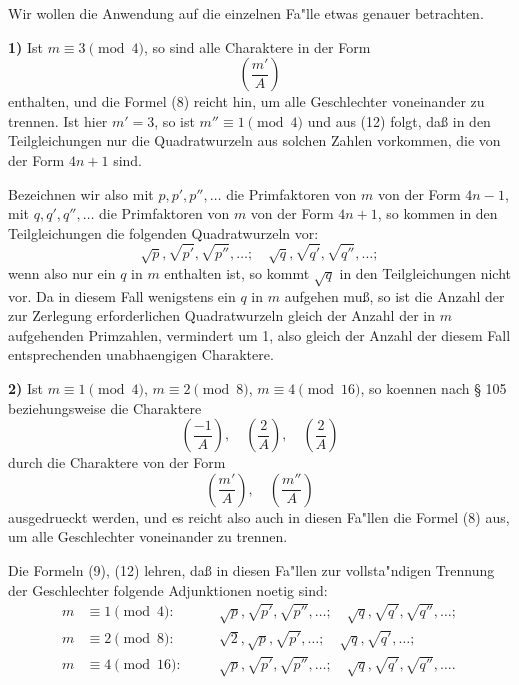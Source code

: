 \documentclass[12pt,a4paper]{article}
\theoremstyle{plain}
\theoremstyle{definition}
\theoremstyle{remark}
\begin{document}
Wir wollen die Anwendung auf die einzelnen Fa"lle etwas genauer betrachten.

\textbf{1)} Ist $m \equiv 3 \pmod{4}$, so sind alle Charaktere in der Form
\begin{equation}\label{eq:138_17}
\left(\frac{m'}{A}\right)
\end{equation}
enthalten, und die Formel (8) reicht hin, um alle Geschlechter voneinander zu trennen. Ist hier $m' = 3$, so ist $m'' \equiv 1 \pmod{4}$ und aus (12) folgt, da\ss{} in den Teilgleichungen nur die Quadratwurzeln aus solchen Zahlen vorkommen, die von der Form $4n + 1$ sind.

Bezeichnen wir also mit $p, p', p'', \ldots$ die Primfaktoren von $m$ von der Form $4n - 1$, mit $q, q', q'', \ldots$ die Primfaktoren von $m$ von der Form $4n + 1$, so kommen in den Teilgleichungen die folgenden Quadratwurzeln vor:
\[
\sqrt{p}, \sqrt{p'}, \sqrt{p''}, \ldots; \quad \sqrt{q}, \sqrt{q'}, \sqrt{q''}, \ldots;
\]
wenn also nur ein $q$ in $m$ enthalten ist, so kommt $\sqrt{q}$ in den Teilgleichungen nicht vor. Da in diesem Fall wenigstens ein $q$ in $m$ aufgehen mu\ss{}, so ist die Anzahl der zur Zerlegung erforderlichen Quadratwurzeln gleich der Anzahl der in $m$ aufgehenden Primzahlen, vermindert um 1, also gleich der Anzahl der diesem Fall entsprechenden unabhaengigen Charaktere.

\textbf{2)} Ist $m \equiv 1 \pmod{4}$, $m \equiv 2 \pmod{8}$, $m \equiv 4 \pmod{16}$, so koennen nach \S{} 105 beziehungsweise die Charaktere
\[
\left(\frac{-1}{A}\right), \quad \left(\frac{2}{A}\right), \quad \left(\frac{2}{A}\right)
\]
durch die Charaktere von der Form
\[
\left(\frac{m'}{A}\right), \quad \left(\frac{m''}{A}\right)
\]
ausgedrueckt werden, und es reicht also auch in diesen Fa"llen die Formel (8) aus, um alle Geschlechter voneinander zu trennen.

Die Formeln (9), (12) lehren, da\ss{} in diesen Fa"llen zur vollsta"ndigen Trennung der Geschlechter folgende Adjunktionen noetig sind:
\begin{align*}
m &\equiv 1 \pmod{4}: &\quad &\sqrt{p}, \sqrt{p'}, \sqrt{p''}, \ldots; \quad \sqrt{q}, \sqrt{q'}, \sqrt{q''}, \ldots;\\
m &\equiv 2 \pmod{8}: &\quad &\sqrt{2}, \sqrt{p}, \sqrt{p'}, \ldots; \quad \sqrt{q}, \sqrt{q'}, \ldots;\\
m &\equiv 4 \pmod{16}: &\quad &\sqrt{p}, \sqrt{p'}, \sqrt{p''}, \ldots; \quad \sqrt{q}, \sqrt{q'}, \sqrt{q''}, \ldots.
\end{align*}
\end{document}
